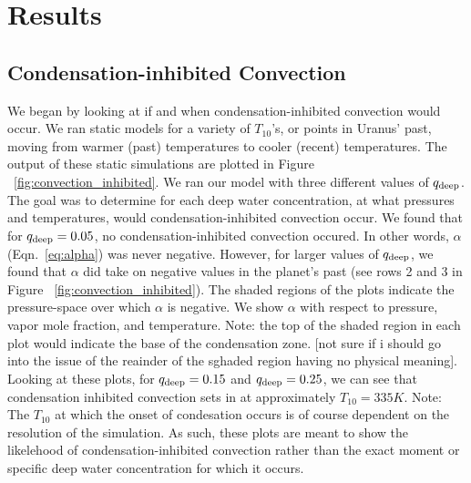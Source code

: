 \documentclass[11pt]{ucscthesisbs}
\begin{document}
\chapter{Results}

\section{Condensation-inhibited Convection}
We began by looking at if and when condensation-inhibited convection would occur. We ran static models for a variety of $T_{10}$'s, or points in Uranus' past, moving from warmer (past) temperatures to cooler (recent) temperatures. The output of these static simulations are plotted in Figure ~\ref{fig:convection_inhibited}. We ran our model with three different values of $q_{\rm deep}$. The goal was to determine for each deep water concentration, at what pressures and temperatures, would condensation-inhibited convection occur. We found that for $q_{\rm deep} = 0.05$, no condensation-inhibited convection occured. In other words, $\alpha$ (Eqn.~\ref{eq:alpha}) was never negative. However, for larger values of $q_{\rm deep}$, we found that $\alpha$ did take on negative values in the planet's past (see rows 2 and 3 in Figure ~\ref{fig:convection_inhibited}). The shaded regions of the plots indicate the pressure-space over which $\alpha$ is negative. We show $\alpha$ with respect to pressure, vapor mole fraction, and temperature. Note: the top of the shaded region in each plot would indicate the base of the condensation zone. [not sure if i should go into the issue of the reainder of the sghaded region having no physical meaning]. Looking at these plots, for $q_{\rm deep} = 0.15$ and $q_{\rm deep} = 0.25$, we can see that condensation inhibited convection sets in at approximately $T_{10} = 335K$. Note: The $T_{10}$ at which the onset of condesation occurs is of course dependent on the resolution of the simulation. As such, these plots are meant to show the likelehood of condensation-inhibited convection rather than the exact moment or specific deep water concentration for which it occurs. 
\end{document}
